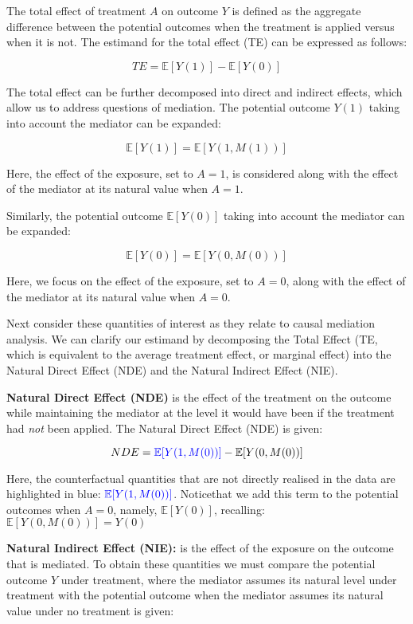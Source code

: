 \documentclass[
  single column]{article}
\begin{document}
The total effect of treatment \(A\) on outcome \(Y\) is defined as the
aggregate difference between the potential outcomes when the treatment
is applied versus when it is not. The estimand for the total effect (TE)
can be expressed as follows:

\[
TE = \mathbb{E}[Y(1)] - \mathbb{E}[Y(0)]
\]

The total effect can be further decomposed into direct and indirect
effects, which allow us to address questions of mediation. The potential
outcome \(Y(1)\) taking into account the mediator can be expanded:

\[ 
\mathbb{E}[Y(1)] = \mathbb{E}[Y(1, M(1))]
\]

Here, the effect of the exposure, set to \(A = 1\), is considered along
with the effect of the mediator at its natural value when \(A = 1\).

Similarly, the potential outcome \(\mathbb{E}[Y(0)]\) taking into
account the mediator can be expanded:

\[ 
\mathbb{E}[Y(0)] = \mathbb{E}[Y(0, M(0))]
\]

Here, we focus on the effect of the exposure, set to \(A = 0\), along
with the effect of the mediator at its natural value when \(A = 0\).

Next consider these quantities of interest as they relate to causal
mediation analysis. We can clarify our estimand by decomposing the Total
Effect (TE, which is equivalent to the average treatment effect, or
marginal effect) into the Natural Direct Effect (NDE) and the Natural
Indirect Effect (NIE).

\textbf{Natural Direct Effect (NDE)} is the effect of the treatment on
the outcome while maintaining the mediator at the level it would have
been if the treatment had \emph{not} been applied. The Natural Direct
Effect (NDE) is given:

\[
 NDE = \textcolor{blue}{\mathbb{E}[Y(1, M(0))]} - \mathbb{E}[Y(0, M(0))]
 \]

Here, the counterfactual quantities that are not directly realised in
the data are highlighted in blue:
\(\textcolor{blue}{\mathbb{E}[Y(1, M(0))]}\). Noticethat we add this
term to the potential outcomes when \(A=0\), namely,
\(\mathbb{E}[Y(0)]\), recalling: \(\mathbb{E}[Y(0, M(0))] = Y(0)\)

\textbf{Natural Indirect Effect (NIE):} is the effect of the exposure on
the outcome that is mediated. To obtain these quantities we must compare
the potential outcome \(Y\) under treatment, where the mediator assumes
its natural level under treatment with the potential outcome when the
mediator assumes its natural value under no treatment is given:
\end{document}
